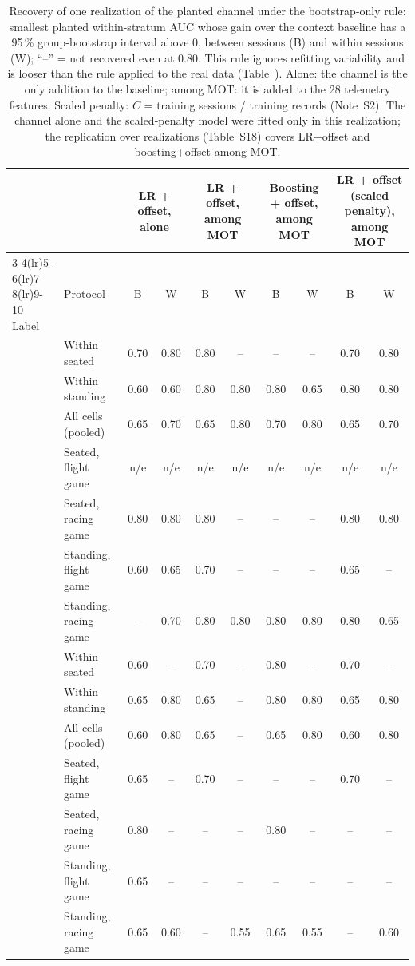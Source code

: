 \begin{table}[ht]
\centering
\footnotesize
\caption{Recovery of one realization of the planted channel under the bootstrap-only rule: smallest planted within-stratum AUC whose gain over the context baseline has a 95\,\% group-bootstrap interval above 0, between sessions (B) and within sessions (W); ``--'' = not recovered even at 0.80. This rule ignores refitting variability and is looser than the rule applied to the real data (Table~). Alone: the channel is the only addition to the baseline; among MOT: it is added to the 28 telemetry features. Scaled penalty: $C$ = training sessions / training records (Note~S2). The channel alone and the scaled-penalty model were fitted only in this realization; the replication over  realizations (Table~S18) covers LR+offset and boosting+offset among MOT.}
\label{tab:supp_recovery}
\setlength{\tabcolsep}{2pt}
\begin{tabular}{@{}llcccccccc@{}}
\toprule
 & & \multicolumn{2}{c}{LR + offset, alone} & \multicolumn{2}{c}{LR + offset, among MOT} & \multicolumn{2}{c}{Boosting + offset, among MOT} & \multicolumn{2}{c}{LR + offset (scaled penalty), among MOT} \\
\cmidrule(lr){3-4}\cmidrule(lr){5-6}\cmidrule(lr){7-8}\cmidrule(lr){9-10}
Label & Protocol & B & W & B & W & B & W & B & W \\
\midrule
\sevtwo{} & Within seated & 0.70 & 0.80 & 0.80 & -- & -- & -- & 0.70 & 0.80 \\
 & Within standing & 0.60 & 0.60 & 0.80 & 0.80 & 0.80 & 0.65 & 0.80 & 0.80 \\
 & All cells (pooled) & 0.65 & 0.70 & 0.65 & 0.80 & 0.70 & 0.80 & 0.65 & 0.70 \\
 & Seated, flight game & n/e & n/e & n/e & n/e & n/e & n/e & n/e & n/e \\
 & Seated, racing game & 0.80 & 0.80 & 0.80 & -- & -- & -- & 0.80 & 0.80 \\
 & Standing, flight game & 0.60 & 0.65 & 0.70 & -- & -- & -- & 0.65 & -- \\
 & Standing, racing game & -- & 0.70 & 0.80 & 0.80 & 0.80 & 0.80 & 0.80 & 0.65 \\
\midrule
\sevone{} & Within seated & 0.60 & -- & 0.70 & -- & 0.80 & -- & 0.70 & -- \\
 & Within standing & 0.65 & 0.80 & 0.65 & -- & 0.80 & 0.80 & 0.65 & 0.80 \\
 & All cells (pooled) & 0.60 & 0.80 & 0.65 & -- & 0.65 & 0.80 & 0.60 & 0.80 \\
 & Seated, flight game & 0.65 & -- & 0.70 & -- & -- & -- & 0.70 & -- \\
 & Seated, racing game & 0.80 & -- & -- & -- & 0.80 & -- & -- & -- \\
 & Standing, flight game & 0.65 & -- & -- & -- & -- & -- & -- & -- \\
 & Standing, racing game & 0.65 & 0.60 & -- & 0.55 & 0.65 & 0.55 & -- & 0.60 \\
\bottomrule
\end{tabular}
\end{table}